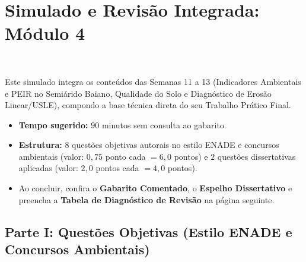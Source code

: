 \clearpage
{}
{}
\chapter*{Simulado e Revisão Integrada: Módulo 4}

\noindent\tagCampo\ \tagPratica
\vspace{6pt}

\begin{boxConceito}
Este simulado integra os conteúdos das Semanas 11 a 13 (Indicadores Ambientais e PEIR no Semiárido Baiano, Qualidade do Solo e Diagnóstico de Erosão Linear/USLE), compondo a base técnica direta do seu Trabalho Prático Final.
\begin{itemize}[leftmargin=1.5em, itemsep=2pt]
  \item \textbf{Tempo sugerido:} $90$ minutos sem consulta ao gabarito.
  \item \textbf{Estrutura:} $8$ questões objetivas autorais no estilo ENADE e concursos ambientais (valor: $0{,}75$ ponto cada $= 6{,}0$ pontos) e $2$ questões dissertativas aplicadas (valor: $2{,}0$ pontos cada $= 4{,}0$ pontos).
  \item Ao concluir, confira o \textbf{Gabarito Comentado}, o \textbf{Espelho Dissertativo} e preencha a \textbf{Tabela de Diagnóstico de Revisão} na página seguinte.
\end{itemize}
\end{boxConceito}

\section*{Parte I: Questões Objetivas (Estilo ENADE e Concursos Ambientais)}

